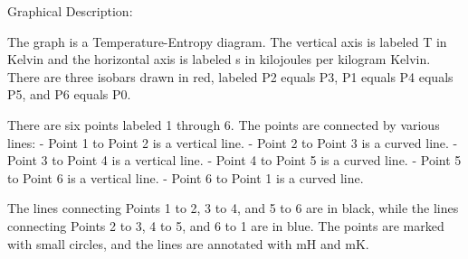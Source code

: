 Graphical Description:

The graph is a Temperature-Entropy diagram. The vertical axis is labeled T in Kelvin and the horizontal axis is labeled s in kilojoules per kilogram Kelvin. There are three isobars drawn in red, labeled P2 equals P3, P1 equals P4 equals P5, and P6 equals P0.

There are six points labeled 1 through 6. The points are connected by various lines:
- Point 1 to Point 2 is a vertical line.
- Point 2 to Point 3 is a curved line.
- Point 3 to Point 4 is a vertical line.
- Point 4 to Point 5 is a curved line.
- Point 5 to Point 6 is a vertical line.
- Point 6 to Point 1 is a curved line.

The lines connecting Points 1 to 2, 3 to 4, and 5 to 6 are in black, while the lines connecting Points 2 to 3, 4 to 5, and 6 to 1 are in blue. The points are marked with small circles, and the lines are annotated with mH and mK.